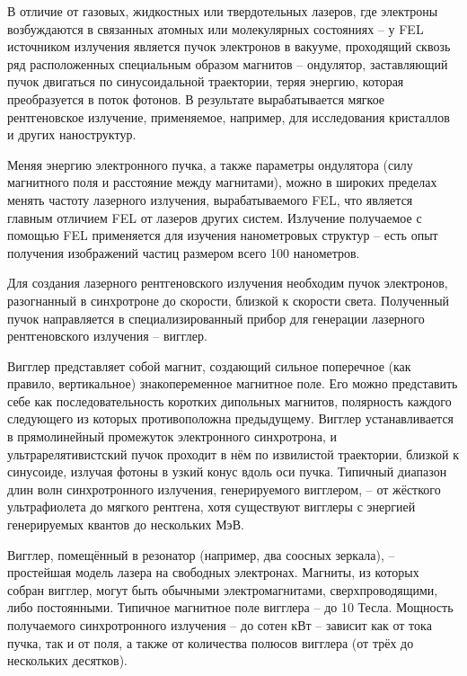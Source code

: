 В отличие от газовых, жидкостных или твердотельных лазеров, где электроны 
возбуждаются в связанных атомных или молекулярных состояниях -- у FEL 
источником излучения является пучок электронов в вакууме, проходящий сквозь 
ряд расположенных специальным образом магнитов -- ондулятор, заставляющий 
пучок двигаться по синусоидальной траектории, теряя энергию, которая 
преобразуется в поток фотонов. В результате вырабатывается мягкое 
рентгеновское излучение, применяемое, например, для исследования кристаллов и 
других наноструктур.

Меняя энергию электронного пучка, а также параметры ондулятора (силу 
магнитного поля и расстояние между магнитами), можно в широких пределах менять 
частоту лазерного излучения, вырабатываемого FEL, что является главным 
отличием FEL от лазеров других систем. Излучение получаемое с помощью FEL 
применяется для изучения нанометровых структур -- есть опыт получения 
изображений частиц размером всего 100 нанометров. 

Для создания лазерного рентгеновского излучения необходим пучок электронов, 
разогнанный в синхротроне до скорости, близкой к скорости света. Полученный 
пучок направляется в специализированный прибор для генерации лазерного 
рентгеновского излучения -- вигглер.

Вигглер представляет собой магнит, создающий сильное поперечное (как правило, 
вертикальное) знакопеременное магнитное поле. Его можно представить себе как 
последовательность коротких дипольных магнитов, полярность каждого следующего 
из которых противоположна предыдущему. Вигглер устанавливается в прямолинейный 
промежуток электронного синхротрона, и ультрарелятивистский пучок проходит в 
нём по извилистой траектории, близкой к синусоиде, излучая фотоны в узкий 
конус вдоль оси пучка. Типичный диапазон длин волн синхротронного излучения, 
генерируемого вигглером, -- от жёсткого ультрафиолета до мягкого рентгена, 
хотя существуют вигглеры с энергией генерируемых квантов до нескольких МэВ.

Вигглер, помещённый в резонатор (например, два соосных зеркала), -- простейшая 
модель лазера на свободных электронах. Магниты, из которых собран вигглер, 
могут быть обычными электромагнитами, сверхпроводящими, либо постоянными. 
Типичное магнитное поле вигглера -- до 10 Тесла. Мощность получаемого 
синхротронного излучения -- до сотен кВт -- зависит как от тока пучка, так и 
от поля, а также от количества полюсов вигглера (от трёх до нескольких 
десятков).